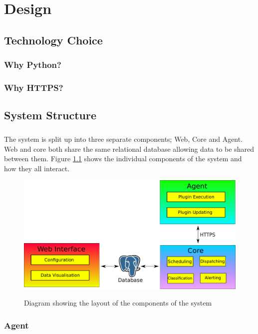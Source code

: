 \documentclass[bsc,logo,twoside]{infthesis}
\begin{document}
	
\chapter{Design}
\section{Technology Choice}
\subsection{Why Python?}
\subsection{Why HTTPS?}

\section{System Structure}
\paragraph*{}
	The system is split up into three separate components; Web, Core and Agent.
	Web and core both share the same relational database allowing data to be
	shared between them.  Figure \ref{system_structure} shows the individual
	components of the system and how they all interact.
	
\begin{figure}[H]
	\caption{Diagram showing the layout of the components of the system}
	\includegraphics[scale=0.5]{assets/system_structure.pdf}
	\label{system_structure}
\end{figure}
		
\subsection{Agent}
\end{document}
